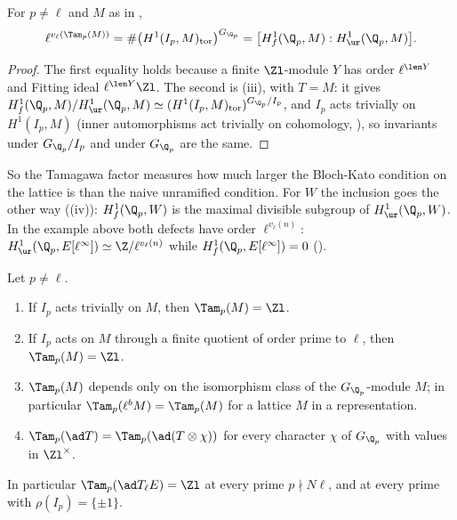 \begin{proposition}\label{prop:blochkato:tam-index}
For $p\ne\ell$ and $M$ as in ,
\[
\ell^{v_\ell(\Tam_p(M))}=\#\bigl(H^1(I_p,M)_{\mathrm{tor}}\bigr)^{G_{\Q_p}}=\bigl[H^1_f(\Q_p,M):H^1_{\ur}(\Q_p,M)\bigr].
\]
\end{proposition}

\begin{proof}
The first equality holds because a finite $\Zl$-module $Y$ has order $\ell^{\len Y}$ and Fitting ideal $\ell^{\len Y}\Zl$. The second is
(iii), with $T=M$: it gives $H^1_f(\Q_p,M)/H^1_{\ur}(\Q_p,M)\simeq(H^1(I_p,M)_{\mathrm{tor}})^{G_{\Q_p}/I_p}$, and $I_p$ acts trivially on $H^1(I_p,M)$
(inner automorphisms act trivially on cohomology, ), so invariants under $G_{\Q_p}/I_p$ and under $G_{\Q_p}$ are the same.
\end{proof}

So the Tamagawa factor measures how much larger the Bloch-Kato condition on the lattice is than the naive unramified condition. For $W$ the inclusion
goes the other way ((iv)): $H^1_f(\Q_p,W)$ is the maximal divisible subgroup of $H^1_{\ur}(\Q_p,W)$. In the example above both defects
have order $\ell^{v_\ell(n)}$: $H^1_{\ur}(\Q_p,E[\ell^\infty])\simeq\Z/\ell^{v_\ell(n)}$ while $H^1_f(\Q_p,E[\ell^\infty])=0$ ().

\begin{proposition}\label{prop:blochkato:tam-basic}
Let $p\ne\ell$.
\begin{enumerate}[label=(\roman*)]
\item If $I_p$ acts trivially on $M$, then $\Tam_p(M)=\Zl$.
\item If $I_p$ acts on $M$ through a finite quotient of order prime to $\ell$, then $\Tam_p(M)=\Zl$.
\item $\Tam_p(M)$ depends only on the isomorphism class of the $G_{\Q_p}$-module $M$; in particular $\Tam_p(\ell^bM)=\Tam_p(M)$ for a lattice $M$ in a representation.
\item $\Tam_p(\ad T)=\Tam_p(\ad(T\otimes\chi))$ for every character $\chi$ of $G_{\Q_p}$ with values in $\Zl^\times$.
\end{enumerate}
In particular $\Tam_p(\ad T_\ell E)=\Zl$ at every prime $p\nmid N\ell$, and at every prime with $\rho(I_p)=\{\pm1\}$.
\end{proposition}

